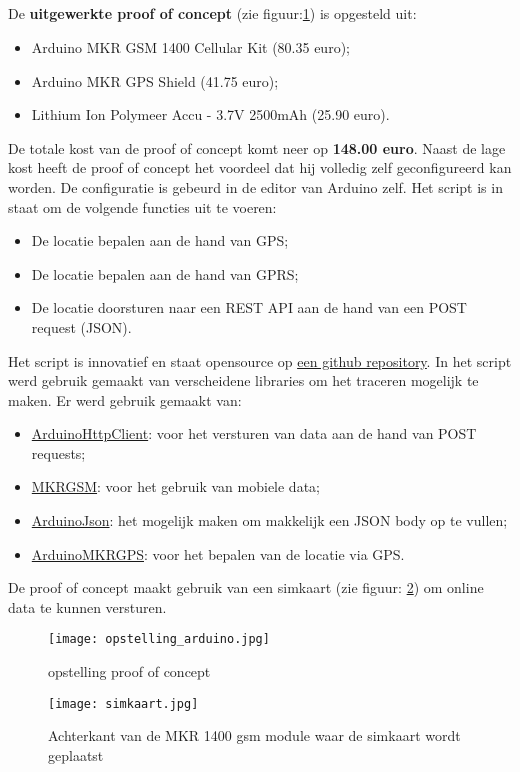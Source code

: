 \subsection{}
De \textbf{uitgewerkte proof of concept} (zie figuur:\ref{fig:opstelling_arduino}) is opgesteld uit:
\begin{itemize}
	\item Arduino MKR GSM 1400 Cellular Kit (80.35 euro);
	\item Arduino MKR GPS Shield (41.75 euro);
	\item Lithium Ion Polymeer Accu - 3.7V 2500mAh (25.90 euro).
\end{itemize}
De totale kost van de proof of concept komt neer op \textbf{148.00 euro}. Naast de lage kost heeft de proof of concept het voordeel dat hij volledig zelf geconfigureerd kan worden. De configuratie is gebeurd in de editor van Arduino zelf. Het script is in staat om de volgende functies uit te voeren:
\begin{itemize}
	\item De locatie bepalen aan de hand van GPS;
	\item De locatie bepalen aan de hand van GPRS;
	\item De locatie doorsturen naar een REST API aan de hand van een POST request (JSON).
\end{itemize}
Het script is innovatief en staat opensource op \underline{\href{https://github.com/IndyVC/bap-arduino}{een github repository}}. In het script werd gebruik gemaakt van verscheidene libraries om het traceren mogelijk te maken.
Er werd gebruik gemaakt van:
\begin{itemize}
	\item \href{https://github.com/arduino-libraries/ArduinoHttpClient}{ArduinoHttpClient}: voor het versturen van data aan de hand van POST requests;
	\item \href{https://github.com/arduino-libraries/MKRGSM}{MKRGSM}: voor het gebruik van mobiele data;
	\item \href{https://github.com/bblanchon/ArduinoJson}{ArduinoJson}: het mogelijk maken om makkelijk een JSON body op te vullen;
	\item \href{https://github.com/arduino-libraries/Arduino_MKRGPS}{ArduinoMKRGPS}: voor het bepalen van de locatie via GPS.
\end{itemize}
De proof of concept maakt gebruik van een simkaart (zie figuur: \ref{fig:simkaart}) om online data te kunnen versturen. 
\begin{figure}
	\texttt{[image: opstelling\_arduino.jpg]}
	\caption{opstelling proof of concept}
	\label{fig:opstelling_arduino}
\end{figure}
\begin{figure}
	\texttt{[image: simkaart.jpg]}
	\caption{Achterkant van de MKR 1400 gsm module waar de simkaart wordt geplaatst}
	\label{fig:simkaart}
\end{figure}

